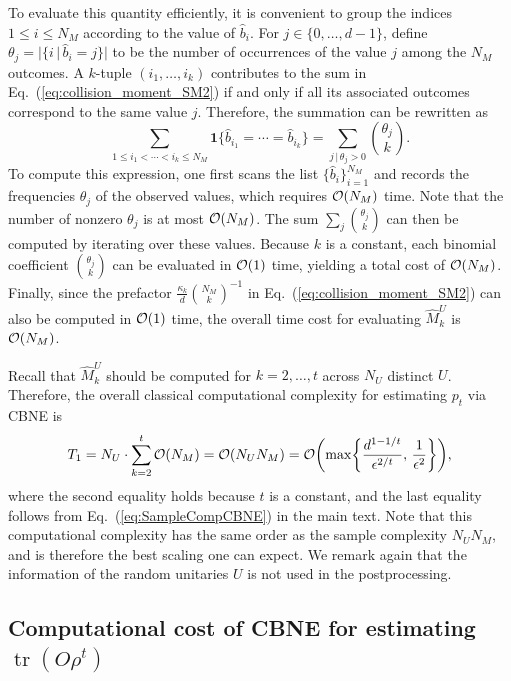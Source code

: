 \documentclass[aps,prl,twocolumn,nofootinbib,superscriptaddress,10pt]{revtex4-2}
\let\originalleft\left
\let\originalright\right
\renewcommand{\left}{\mathopen{}\mathclose\bgroup\originalleft}
\renewcommand{\right}{\aftergroup\egroup\originalright}
\DeclareMathOperator{\Tr}{tr}
\newcommand{\bigo}[1]{\mathcal{O}\left(#1\right)}
\theoremstyle{plain}
\theoremstyle{definition}
\newcommand{\eref}[1]{Eq.~\textup{(\ref{#1})}}
\begin{document}
To evaluate this quantity efficiently, it is convenient to group the
indices $1\le i\le N_M$ according to the value of $\hat{b}_i$.
For $j\in\{0,\ldots,d-1\}$, define
$\theta_j = \bigl|\{i\,|\,\hat{b}_i=j\}\bigr|$ 
to be the number of occurrences of the value $j$ among the $N_M$ outcomes.
A $k$-tuple $(i_1,\ldots,i_k)$ contributes to the sum in \eref{eq:collision_moment_SM2} if and only if all its associated outcomes correspond to the same value $j$.
Therefore, the summation can be rewritten as
\begin{equation}
\sum_{1\le i_1<\cdots<i_k\le N_M}
\mathbf{1}\{\hat{b}_{i_1}=\cdots=\hat{b}_{i_k}\}
=
\sum_{j\,|\,\theta_j>0}\binom{\theta_j}{k}.
\end{equation}
To compute this expression, one first scans the list
$\{\hat{b}_i\}_{i=1}^{N_M}$ and records the frequencies $\theta_j$ of the observed values, which requires $\bigo{N_M}$ time.
Note that the number of nonzero $\theta_j$ is at most $\bigo{N_M}$.
The sum $\sum_j \binom{\theta_j}{k}$ can then be computed by iterating over these values.
Because $k$ is a constant, each binomial coefficient $\binom{\theta_j}{k}$ can be evaluated in $\bigo{1}$ time, yielding a total cost of $\bigo{N_M}$.
Finally, since the prefactor $\frac{\kappa_k}{d}\binom{N_M}{k}^{-1}$ in \eref{eq:collision_moment_SM2} can also be computed in $\bigo{1}$ time, the overall time cost for evaluating $\hat M_k^U$ is $\bigo{N_M}$.

Recall that $\hat M_k^U$ should be computed for $k=2,\dots,t$ across $N_U$ distinct $U$.
Therefore, the overall classical computational complexity for estimating $p_t$ via CBNE is
\begin{equation}
T_1=N_U\cdot\sum_{k=2}^{t}\bigo{N_M}
=\bigo{N_UN_M}
=\bigo{\max \left\{\frac{d^{1-1/t}}{\epsilon^{2/t}},\,\frac{1}{\epsilon^2}\right\}}, 
\end{equation}
where the second equality holds because $t$ is a constant, and the last equality follows from \eref{eq:SampleCompCBNE} in the main text. 
Note that this computational complexity has the same order as the sample complexity $N_U N_M$, and is therefore the best scaling one can expect.
We remark again that the information of the random unitaries $U$ is not used in the postprocessing. 


\subsection{Computational cost of CBNE for estimating \texorpdfstring{$\Tr(O\rho^t)$}{}}
\end{document}
